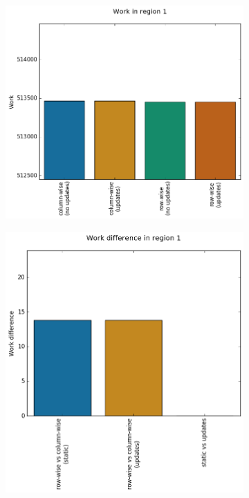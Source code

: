 \documentclass{tamuccthesis}
\begin{document}
\begin{figure}
    \captionsetup{justification=centering}
    \centering
    \begin{subfigure}[b]{0.275\textwidth}
        \centering
        \includegraphics[width=\textwidth]{work_r1.png}
        \label{fig:coverage_noterrain_work_r1}
    \end{subfigure}
    \hfill
    \begin{subfigure}[b]{0.275\textwidth}  
        \centering 
        \includegraphics[width=\textwidth]{diff_r1.png}

\end{subfigure}
\end{figure}
\end{document}

